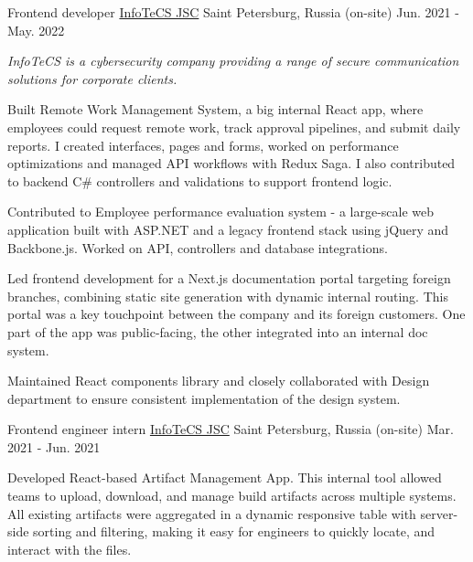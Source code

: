 \begin{cventries}
  \cventry
    {Frontend developer} %
    {\href{https://infotecs.ru/}{InfoTeCS JSC}}
    {Saint Petersburg, Russia (on-site)} %
    {Jun. 2021 - May. 2022} %
    {
      \begin{cvitems} %
      \vspace{8pt}
      \item[] {\small\textit{InfoTeCS is a cybersecurity company providing a range of secure communication solutions for corporate clients.}}
      \vspace{8pt}
        \item {Built Remote Work Management System, a big internal React app, where employees could request remote work, track approval pipelines, and submit daily reports. I created interfaces, pages and forms, worked on performance optimizations and managed API workflows with Redux Saga. I also contributed to backend C\# controllers and validations to support frontend logic. }
        \item {Contributed to Employee performance evaluation system - a large-scale web application built with ASP.NET and a legacy frontend stack using jQuery and Backbone.js. Worked on API, controllers and database integrations.}
        \item {Led frontend development for a Next.js documentation portal targeting foreign branches, combining static site generation with dynamic internal routing. This portal was a key touchpoint between the company and its foreign customers. One part of the app was public-facing, the other integrated into an internal doc system.}
        \item {Maintained React components library and closely collaborated with Design department to ensure consistent implementation of the design system.}
      \end{cvitems}
    }
    {\vspace{16pt}}

  \cventry
    {Frontend engineer intern} %
    {\href{https://infotecs.ru/}{InfoTeCS JSC}}
    {Saint Petersburg, Russia (on-site)} %
    {Mar. 2021 - Jun. 2021} %
    {
      \begin{cvitems} %
        \item {Developed React-based Artifact Management App. This internal tool allowed teams to upload, download, and manage build artifacts across multiple systems. All existing artifacts were aggregated in a dynamic responsive table with server-side sorting and filtering, making it easy for engineers to quickly locate, and interact with the files.}
      \end{cvitems}
    }
    {\vspace{16pt}}


\end{cventries}

